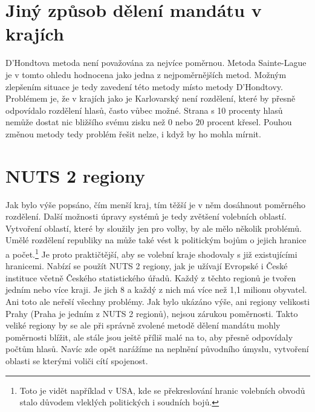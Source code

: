 \documentclass[12pt]{report}
\begin{document}
\section{Jiný způsob dělení mandátu v krajích}
D'Hondtova metoda není považována za nejvíce poměrnou.
Metoda Sainte-Lague je v tomto ohledu hodnocena jako jedna z nejpoměrnějších metod.\autocite{BEN} Možným zlepšením situace je tedy zavedení této metody místo metody D'Hondtovy.
Problémem je, že v krajích jako je Karlovarský není rozdělení, které by přesně odpovídalo rozdělení hlasů, často vůbec možné.
Strana s 10 procenty hlasů nemůže dostat nic bližšího svému zisku než 0 nebo 20 procent křesel.
Pouhou změnou metody tedy problém řešit nelze, i když by ho mohla mírnit.
\section{NUTS 2 regiony} 
Jak bylo výše popsáno, čím menší kraj, tím těžší je v něm dosáhnout poměrného rozdělení.
Další možnosti úpravy systémů je tedy zvětšení volebních oblastí.
Vytvoření oblastí, které by sloužily jen pro volby, by ale mělo několik problémů.
Umělé rozdělení republiky na  může také vést k politickým bojům o jejich hranice a počet.\footnote{Toto je vidět například v USA, kde se překreslování hranic volebních obvodů stalo důvodem vleklých politických i soudních bojů.}
Je proto praktičtější, aby se volební kraje shodovaly s již existujícími hranicemi.
Nabízí se použít NUTS 2 regiony, jak je užívají Evropské i České instituce včetně Českého statistického úřadů.
Každý z těchto regionů je tvořen jedním nebo více kraji.
Je jich 8 a každý z nich má více než 1,1 milionu obyvatel.
Ani toto ale neřeší všechny problémy.
Jak bylo ukázáno výše, ani regiony velikosti Prahy (Praha je jedním z NUTS 2 regionů), nejsou zárukou poměrnosti.
Takto veliké regiony by se ale při správně zvolené metodě dělení mandátu mohly poměrnosti blížit, ale stále jsou ještě příliš malé na to, aby přesně odpovídaly počtům hlasů.
Navíc zde opět narážíme na neplnění původního úmyslu, vytvoření oblasti se kterými voliči cítí spojenost.
\end{document}
